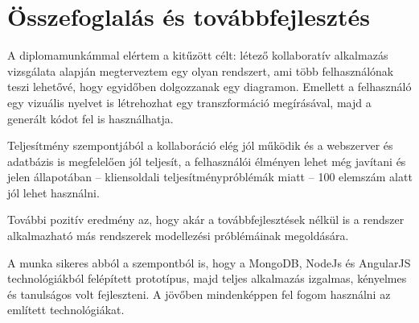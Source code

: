 \chapter{Összefoglalás és továbbfejlesztés}

A diplomamunkámmal elértem a kitűzött célt: létező kollaboratív alkalmazás vizsgálata alapján megterveztem egy olyan rendszert, ami több felhasználónak teszi lehetővé, hogy egyidőben dolgozzanak egy diagramon. Emellett a felhasználó egy vizuális nyelvet is létrehozhat egy transzformáció megírásával, majd a generált kódot fel is használhatja. 

Teljesítmény szempontjából a kollaboráció elég jól működik és a webszerver és adatbázis is megfelelően jól teljesít, a felhasználói élményen lehet még javítani és jelen állapotában -- kliensoldali teljesítménypróblémák miatt -- 100 elemszám alatt jól lehet használni.

További pozitív eredmény az, hogy akár a továbbfejlesztések nélkül is a rendszer alkalmazható más rendszerek modellezési próblémáinak megoldására. 

A munka sikeres abból a szempontból is, hogy a MongoDB, NodeJs és AngularJS technológiákból felépített prototípus, majd teljes alkalmazás izgalmas, kényelmes és tanulságos volt fejleszteni. A jövőben mindenképpen fel fogom használni az említett technológiákat.








